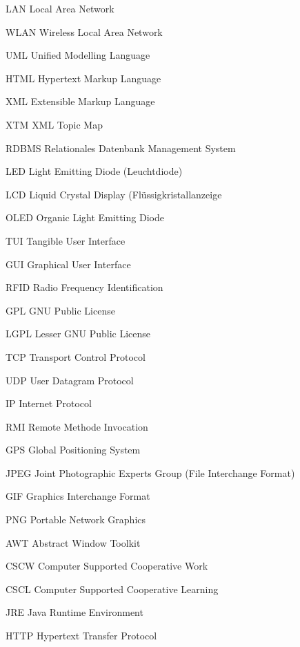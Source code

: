 {LAN}
{Local Area Network}

{WLAN}
{Wireless Local Area Network}

{UML}
{Unified Modelling Language}

{HTML}
{Hypertext Markup Language}

{XML}
{Extensible Markup Language}

{XTM}
{XML Topic Map}

{RDBMS}
{Relationales Datenbank Management System}

{LED}
{Light Emitting Diode (Leuchtdiode)}

{LCD}
{Liquid Crystal Display (Flüssigkristallanzeige}

{OLED}
{Organic Light Emitting Diode}

{TUI}
{Tangible User Interface}

{GUI}
{Graphical User Interface}

{RFID}
{Radio Frequency Identification}

{GPL}
{GNU Public License}

{LGPL}
{Lesser GNU Public License}

{TCP}
{Transport Control Protocol}

{UDP}
{User Datagram Protocol}

{IP}
{Internet Protocol}

{RMI}
{Remote Methode Invocation}

{GPS}
{Global Positioning System}

{JPEG}
{Joint Photographic Experts Group (File Interchange Format)}

{GIF}
{Graphics Interchange Format}

{PNG}
{Portable Network Graphics}

{AWT}
{Abstract Window Toolkit}

{CSCW}
{Computer Supported Cooperative Work}

{CSCL}
{Computer Supported Cooperative Learning}

{JRE}
{Java Runtime Environment}

{HTTP}
{Hypertext Transfer Protocol}

